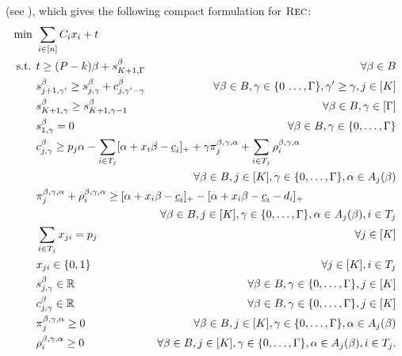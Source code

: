 (see \cite{korte2006combinatorial}),
which gives the following compact formulation for $\textsc{Rec}$:
\begin{subequations}\allowdisplaybreaks
\label{eq:com}  
\begin{align}
\min\ & \sum_{i\in[n]} C_i x_i + t \label{com-1} \\
\text{s.t. } & t \ge (P-k)\beta + s^\beta_{K+1,\Gamma} & \forall \beta \in B \label{com-2}\\
% 
& s^\beta_{j+1,\gamma'} \ge s^\beta_{j,\gamma} + c^\beta_{j,\gamma'-\gamma} & \forall \beta \in B, \gamma\in \{0\,\ldots,\Gamma\}, \gamma'\ge \gamma, j \in [K] \label{com-3}\\
% 
& s^\beta_{K+1,\gamma} \ge s^\beta_{K+1,\gamma-1} & \forall \beta\in B, \gamma\in[\Gamma] \label{com-4}\\
% 
& s^\beta_{1,\gamma} =0 & \forall \beta\in B, \gamma\in \{0,\ldots,\Gamma\} \label{com-5}\\
% 
& c^\beta_{j,\gamma} \ge  p_j \alpha - \sum_{i\in T_j} [\alpha + x_i\beta - \underline{c}_i]_+ + \gamma \pi^{\beta,\gamma,\alpha}_j + \sum_{i\in T_j} \rho^{\beta,\gamma,\alpha}_i \hspace{-5cm} \nonumber\\
& & \forall \beta \in B, j \in [K], \gamma \in \{0,\ldots,\Gamma\}, \alpha \in A_j(\beta) \label{com-6} \\
% 
& \pi^{\beta,\gamma,\alpha}_j + \rho^{\beta,\gamma,\alpha}_i \ge [\alpha + x_i\beta - \underline{c}_i]_+ - [\alpha + x_i \beta - \underline{c}_i - d_i]_+ \hspace{-5cm} \nonumber\\
& & \forall \beta\in B, j\in [K], \gamma\in \{0,\ldots,\Gamma\}, \alpha \in A_j(\beta), i\in T_j \label{com-7}\\
% 
& \sum_{i\in T_j} x_{ji} = p_j & \forall j\in [K] \label{com-8}\\
% 
& x_{ji} \in\{0,1\} & \forall j\in[K], i\in T_j \label{com-9}\\
% 
& s^\beta_{j,\gamma} \in \rr & \forall \beta \in B, \gamma\in\{0,\ldots,\Gamma\},j\in[K] \\
& c^\beta_{j,\gamma} \in \rr & \forall \beta \in B, \gamma\in\{0,\ldots,\Gamma\},j\in[K] \\
% 
& \pi^{\beta,\gamma,\alpha}_j \ge 0 & \forall \beta\in B, j\in[K], \gamma\in\{0,\ldots,\Gamma\}, \alpha\in A_j(\beta) \label{com-10} \\
% 
& \rho^{\beta,\gamma,\alpha}_i \ge 0 & \forall \beta\in B, j\in[K], \gamma\in\{0,\ldots,\Gamma\}, \alpha\in A_j(\beta), i\in T_j. \label{com-11}
\end{align}
\end{subequations}
